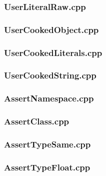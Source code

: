 \documentclass[11pt,]{report}
\begin{document}
\begin{appendix}
\subsubsection{UserLiteralRaw.cpp}
\label{sub:UserLiteralRaw.cpp}


\subsubsection{UserCookedObject.cpp}
\label{sub:UserCookedObject.cpp}


\subsubsection{UserCookedLiterals.cpp}
\label{sub:UserCookedLiterals.cpp}


\subsubsection{UserCookedString.cpp}
\label{sub:UserCookedString.cpp}


\subsubsection{AssertNamespace.cpp}
\label{sub:AssertNamespace.cpp}


\subsubsection{AssertClass.cpp}
\label{sub:AssertClass.cpp}


\subsubsection{AssertTypeSame.cpp}
\label{sub:UserCookedString.cpp}


\subsubsection{AssertTypeFloat.cpp}
\label{sub:AssertTypeFloat.cpp}

\end{appendix}
\end{document}
